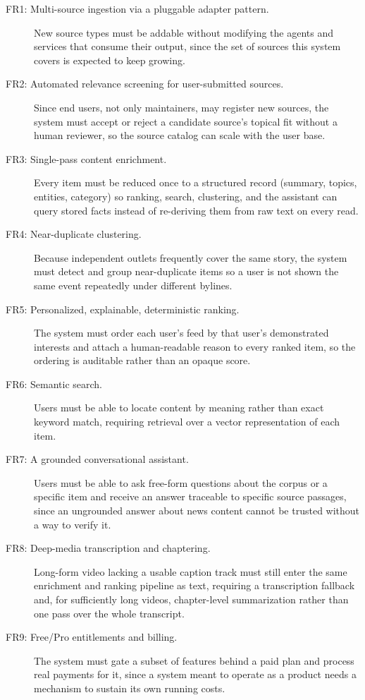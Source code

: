 \begin{description}
  \item[FR1: Multi-source ingestion via a pluggable adapter pattern.]
  New source types must be addable without modifying the agents and
  services that consume their output, since the set of sources this system
  covers is expected to keep growing.

  \item[FR2: Automated relevance screening for user-submitted sources.]
  Since end users, not only maintainers, may register new sources, the
  system must accept or reject a candidate source's topical fit without a
  human reviewer, so the source catalog can scale with the user base.

  \item[FR3: Single-pass content enrichment.]
  Every item must be reduced once to a structured record (summary, topics,
  entities, category) so ranking, search, clustering, and the assistant can
  query stored facts instead of re-deriving them from raw text on every
  read.

  \item[FR4: Near-duplicate clustering.]
  Because independent outlets frequently cover the same story, the system
  must detect and group near-duplicate items so a user is not shown the
  same event repeatedly under different bylines.

  \item[FR5: Personalized, explainable, deterministic ranking.]
  The system must order each user's feed by that user's demonstrated
  interests and attach a human-readable reason to every ranked item, so the
  ordering is auditable rather than an opaque score.

  \item[FR6: Semantic search.]
  Users must be able to locate content by meaning rather than exact
  keyword match, requiring retrieval over a vector representation of each
  item.

  \item[FR7: A grounded conversational assistant.]
  Users must be able to ask free-form questions about the corpus or a
  specific item and receive an answer traceable to specific source
  passages, since an ungrounded answer about news content cannot be
  trusted without a way to verify it.

  \item[FR8: Deep-media transcription and chaptering.]
  Long-form video lacking a usable caption track must still enter the same
  enrichment and ranking pipeline as text, requiring a transcription
  fallback and, for sufficiently long videos, chapter-level summarization
  rather than one pass over the whole transcript.

  \item[FR9: Free/Pro entitlements and billing.]
  The system must gate a subset of features behind a paid plan and process
  real payments for it, since a system meant to operate as a product needs
  a mechanism to sustain its own running costs.
\end{description}

